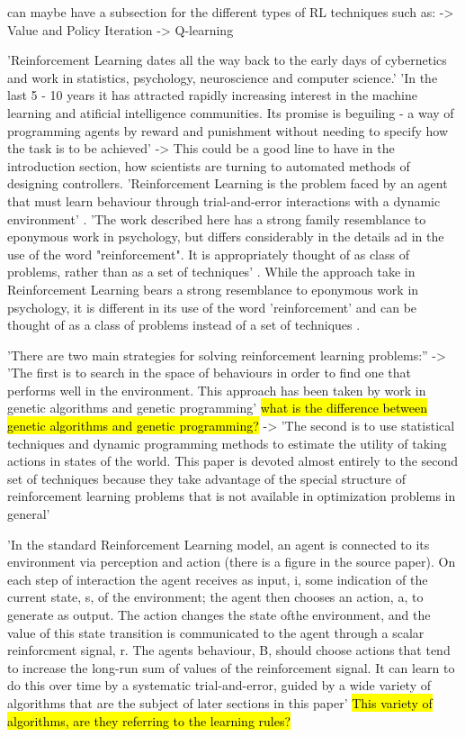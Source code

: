 can maybe have a subsection for the different types of RL techniques such as:
-> Value and Policy Iteration
-> Q-learning


'Reinforcement Learning dates all the way back to the early days of cybernetics and work in statistics, psychology, neuroscience and computer science.'\cite{KaelblingLittmanMoore1996}
'In the last 5 - 10 years it has attracted rapidly increasing interest in the machine learning and atificial intelligence communities. Its promise is beguiling - a way of programming agents by reward and punishment without needing to specify how the task is to be achieved' \cite{KaelblingLittmanMoore1996}
-> This could be a good line to have in the introduction section, how scientists are turning to automated methods of designing controllers.
'Reinforcement Learning is the problem faced by an agent that must learn behaviour through trial-and-error interactions with a dynamic environment' \cite{KaelblingLittmanMoore1996}.
'The work described here has a strong family resemblance to eponymous work in psychology, but differs considerably in the details ad in the use of the word "reinforcement". It is appropriately thought of as  class of problems, rather than as a set of techniques' \cite{KaelblingLittmanMoore1996}.
While the approach take in Reinforcement Learning bears a strong resemblance to eponymous work in psychology, it is different in its use of the word 'reinforcement' and can be thought of as a class of problems instead of a set of techniques \cite{KaelblingLittmanMoore1996}.

'There are two main strategies for solving reinforcement learning problems:''
-> 'The first is to search in the space of behaviours in order to find one that performs well in the environment. This approach has been taken by work in genetic algorithms and genetic programming'  \hl{what is the difference between genetic algorithms and genetic programming?}
-> 'The second is to use statistical techniques and dynamic programming methods to estimate the utility of taking actions in states of the world. This paper is devoted almost entirely to the second set of techniques because they take advantage of the special structure of reinforcement learning problems that is not available in optimization problems in general' \cite{KaelblingLittmanMoore1996}

'In the standard Reinforcement Learning model, an agent is connected to its environment via perception and action (there is a figure in the source paper). On each step of interaction the agent receives as input, i, some indication of the current state, s, of the environment; the agent then chooses an action, a, to generate as output. The action changes the state ofthe environment, and the value of this state transition is communicated to the agent through a scalar reinforcment signal, r. The agents behaviour, B, should choose actions that tend to increase the long-run sum of values of the reinforcement signal. It can learn to do this over time by a systematic trial-and-error, guided by a wide variety of algorithms that are the subject of later sections in this paper'
\hl{This variety of algorithms, are they referring to the learning rules?}

